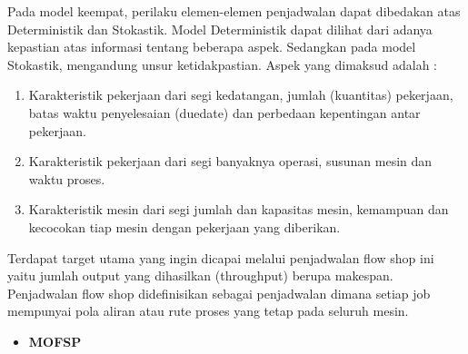 \documentclass[a4paper,twoside]{article}
\begin{document}
\begin{enumerate}
\begin{itemize}
		 Pada model keempat, perilaku elemen-elemen penjadwalan dapat dibedakan atas Deterministik dan Stokastik. Model Deterministik dapat dilihat dari adanya kepastian atas informasi tentang beberapa aspek. Sedangkan pada model Stokastik, mengandung unsur ketidakpastian. Aspek yang dimaksud adalah :
		 \begin{enumerate}
		 	\item Karakteristik pekerjaan dari segi kedatangan, jumlah (kuantitas) pekerjaan, batas waktu penyelesaian (duedate) dan perbedaan kepentingan antar pekerjaan.
		 	\item Karakteristik pekerjaan dari segi banyaknya operasi, susunan mesin dan waktu proses.
		 	\item Karakteristik mesin dari segi jumlah dan kapasitas mesin, kemampuan dan kecocokan tiap mesin dengan pekerjaan yang diberikan. 
		 \end{enumerate}
		Terdapat target utama yang ingin dicapai melalui penjadwalan flow shop ini yaitu jumlah output yang dihasilkan (throughput) berupa makespan. Penjadwalan flow shop didefinisikan sebagai penjadwalan dimana setiap job mempunyai pola aliran atau rute proses yang tetap pada seluruh mesin.
		\end{itemize}	
	
	
		\begin{itemize}
		\item {\bf MOFSP}
		
		\end{itemize}	
		

\end{enumerate}
\end{document}
